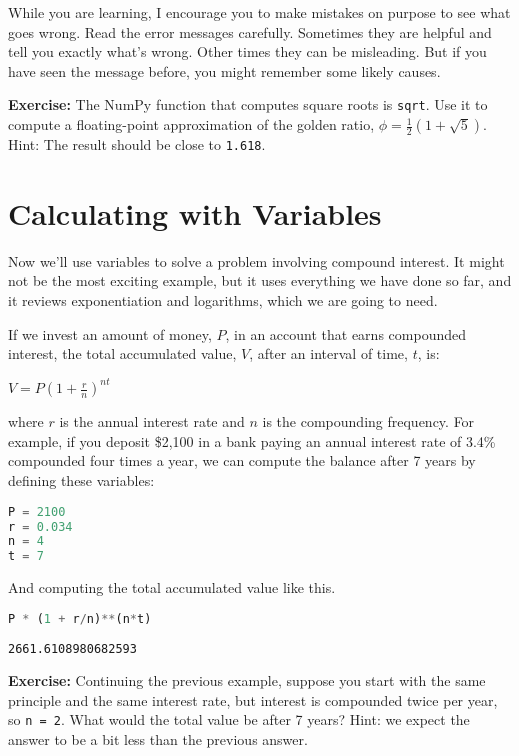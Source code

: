 \documentclass[
]{book}
\newcommand{\passthrough}[1]{#1}
\begin{document}
While you are learning, I encourage you to make mistakes on purpose to
see what goes wrong. Read the error messages carefully. Sometimes they
are helpful and tell you exactly what's wrong. Other times they can be
misleading. But if you have seen the message before, you might remember
some likely causes.

\textbf{Exercise:} The NumPy function that computes square roots is
\passthrough{\lstinline!sqrt!}. Use it to compute a floating-point
approximation of the golden ratio, \(\phi = \frac{1}{2}(1 + \sqrt{5})\).
Hint: The result should be close to \passthrough{\lstinline!1.618!}.

\section{Calculating with Variables}\label{calculating-with-variables}

Now we'll use variables to solve a problem involving compound interest.
It might not be the most exciting example, but it uses everything we
have done so far, and it reviews exponentiation and logarithms, which we
are going to need.

If we invest an amount of money, \(P\), in an account that earns
compounded interest, the total accumulated value, \(V\), after an
interval of time, \(t\), is:

\(V=P\left(1+{\frac {r}{n}}\right)^{nt}\)

where \(r\) is the annual interest rate and \(n\) is the compounding
frequency. For example, if you deposit \$2,100 in a bank paying an
annual interest rate of 3.4\% compounded four times a year, we can
compute the balance after 7 years by defining these variables:

\begin{lstlisting}[language=Python]
P = 2100
r = 0.034
n = 4
t = 7
\end{lstlisting}

And computing the total accumulated value like this.

\begin{lstlisting}[language=Python]
P * (1 + r/n)**(n*t)
\end{lstlisting}

\begin{lstlisting}
2661.6108980682593
\end{lstlisting}

\textbf{Exercise:} Continuing the previous example, suppose you start
with the same principle and the same interest rate, but interest is
compounded twice per year, so \passthrough{\lstinline!n = 2!}. What
would the total value be after 7 years? Hint: we expect the answer to be
a bit less than the previous answer.
\end{document}
